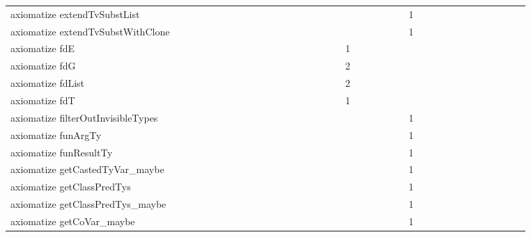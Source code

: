 {\begin{tabular}{l|rrr|rrr|rrr}
axiomatize extendTvSubstList &  &  &  &  &  &  &  &  &  &  &  &  &  &  &  &  &  &  &  &  &  &  &  & 1 &  &  &  &  &  &  &  &  &  &  &  & \\
axiomatize extendTvSubstWithClone &  &  &  &  &  &  &  &  &  &  &  &  &  &  &  &  &  &  &  &  &  &  &  & 1 &  &  &  &  &  &  &  &  &  &  &  & \\
axiomatize fdE &  &  &  &  &  &  &  &  &  &  &  &  &  &  &  &  &  & 1 &  &  &  &  &  &  &  &  &  &  &  &  &  &  &  &  &  & \\
axiomatize fdG &  &  &  &  &  &  &  &  &  &  &  &  &  &  &  &  &  & 2 &  &  &  &  &  &  &  &  &  &  &  &  &  &  &  &  &  & \\
axiomatize fdList &  &  &  &  &  &  &  &  &  &  &  &  &  &  &  &  &  & 2 &  &  &  &  &  &  &  &  &  &  &  &  &  &  &  &  &  & \\
axiomatize fdT &  &  &  &  &  &  &  &  &  &  &  &  &  &  &  &  &  & 1 &  &  &  &  &  &  &  &  &  &  &  &  &  &  &  &  &  & \\
axiomatize filterOutInvisibleTypes &  &  &  &  &  &  &  &  &  &  &  &  &  &  &  &  &  &  &  &  &  &  &  & 1 &  &  &  &  &  &  &  &  &  &  &  & \\
axiomatize funArgTy &  &  &  &  &  &  &  &  &  &  &  &  &  &  &  &  &  &  &  &  &  &  &  & 1 &  &  &  &  &  &  &  &  &  &  &  & \\
axiomatize funResultTy &  &  &  &  &  &  &  &  &  &  &  &  &  &  &  &  &  &  &  &  &  &  &  & 1 &  &  &  &  &  &  &  &  &  &  &  & \\
axiomatize getCastedTyVar_maybe &  &  &  &  &  &  &  &  &  &  &  &  &  &  &  &  &  &  &  &  &  &  &  & 1 &  &  &  &  &  &  &  &  &  &  &  & \\
axiomatize getClassPredTys &  &  &  &  &  &  &  &  &  &  &  &  &  &  &  &  &  &  &  &  &  &  &  & 1 &  &  &  &  &  &  &  &  &  &  &  & \\
axiomatize getClassPredTys_maybe &  &  &  &  &  &  &  &  &  &  &  &  &  &  &  &  &  &  &  &  &  &  &  & 1 &  &  &  &  &  &  &  &  &  &  &  & \\
axiomatize getCoVar_maybe &  &  &  &  &  &  &  &  &  &  &  &  &  &  &  &  &  &  &  &  &  &  &  & 1 &  &  &  &  &  &  &  &  &  &  &  & \\

\end{tabular}}
